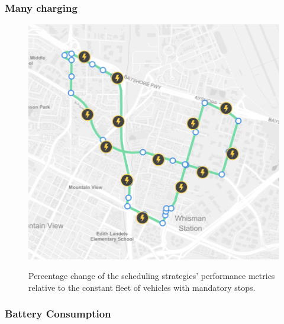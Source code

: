 \documentclass[12pt,a4paper]{article}
\begin{document}
\subsubsection{Many charging}
\begin{figure}[h] 
  \centering
  \caption{Percentage change of the scheduling strategies' performance metrics relative to the constant fleet of vehicles with mandatory stops.}
\includegraphics[scale=0.5]{./images/manycharging}
\label{manycharging}
\end{figure}

\subsubsection{Battery Consumption}
\end{document}
